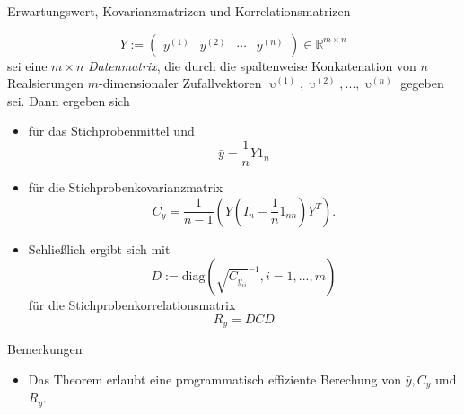 \documentclass[
  8pt,
  ignorenonframetext,
]{beamer}
\providecommand{\tightlist}{%
  \setlength{\itemsep}{0pt}\setlength{\parskip}{0pt}}
\DeclareMathOperator*{\ups}{\upsilon}
\begin{document}
\begin{frame}{Erwartungswert, Kovarianzmatrizen und
Korrelationsmatrizen}
\protect\hypertarget{erwartungswert-kovarianzmatrizen-und-korrelationsmatrizen-6}{}
\footnotesize
\begin{theorem}
\justifying
\normalfont
\begin{equation}
Y :=
\begin{pmatrix}
y^{(1)} & y^{(2)} & \cdots & y^{(n)}
\end{pmatrix}
\in \mathbb{R}^{m \times n}
\end{equation}
sei eine $m \times n$ \textit{Datenmatrix}, die durch die spaltenweise Konkatenation
von $n$ Realsierungen $m$-dimensionaler Zufallvektoren $\ups^{(1)}, \ups^{(2)}, ...,\ups^{(n)}$
gegeben sei. Dann ergeben sich
\begin{itemize}
\item für das Stichprobenmittel und
\begin{equation}
\bar{y} =  \frac{1}{n}Y1_{n}
\end{equation}
\item für die Stichprobenkovarianzmatrix 
\begin{equation}
C_y = \frac{1}{n-1}\left(Y\left(I_n - \frac{1}{n}1_{nn}\right)Y^T\right).
\end{equation}
\item Schließlich ergibt sich mit 
\begin{equation}
D := \mbox{diag}\left(\sqrt{C_{y_{ii}}}^{-1}, i = 1,...,m\right)
\end{equation}
für die Stichprobenkorrelationsmatrix
\begin{equation}
R_y = DCD
\end{equation}
\end{itemize}
\end{theorem}

Bemerkungen

\begin{itemize}
\tightlist
\item
  Das Theorem erlaubt eine programmatisch effiziente Berechung von
  \(\bar{y}, C_y\) und \(R_y\).
\end{itemize}
\end{frame}
\end{document}

